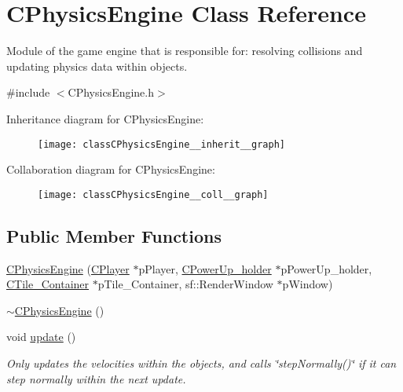 \hypertarget{classCPhysicsEngine}{\section{C\-Physics\-Engine Class Reference}
\label{classCPhysicsEngine}
}


Module of the game engine that is responsible for\-: resolving collisions and updating physics data within objects.  




{\ttfamily \#include $<$C\-Physics\-Engine.\-h$>$}



Inheritance diagram for C\-Physics\-Engine\-:\nopagebreak
\begin{figure}[H]
\begin{center}
\leavevmode
\texttt{[image: classCPhysicsEngine\_\_inherit\_\_graph]}
\end{center}
\end{figure}


Collaboration diagram for C\-Physics\-Engine\-:\nopagebreak
\begin{figure}[H]
\begin{center}
\leavevmode
\texttt{[image: classCPhysicsEngine\_\_coll\_\_graph]}
\end{center}
\end{figure}
\subsection*{Public Member Functions}
\begin{DoxyCompactItemize}
\item 
\hyperlink{classCPhysicsEngine_ace75d050c06185304fde6321bac6245f}{C\-Physics\-Engine} (\hyperlink{classCPlayer}{C\-Player} $\ast$p\-Player, \hyperlink{classCPowerUp__holder}{C\-Power\-Up\-\_\-holder} $\ast$p\-Power\-Up\-\_\-holder, \hyperlink{classCTile__Container}{C\-Tile\-\_\-\-Container} $\ast$p\-Tile\-\_\-\-Container, sf\-::\-Render\-Window $\ast$p\-Window)
\item 
\hyperlink{classCPhysicsEngine_a2e432f93b60e9e38a8882223ea3ee71b}{$\sim$\-C\-Physics\-Engine} ()
\item 
void \hyperlink{classCPhysicsEngine_abc493897bbdb15e6787a25478730f1f5}{update} ()
\begin{DoxyCompactList}\small\item\em Only updates the velocities within the objects, and calls \char`\"{}step\-Normally()\char`\"{} if it can step normally within the next update. \end{DoxyCompactList}\end{DoxyCompactItemize}


